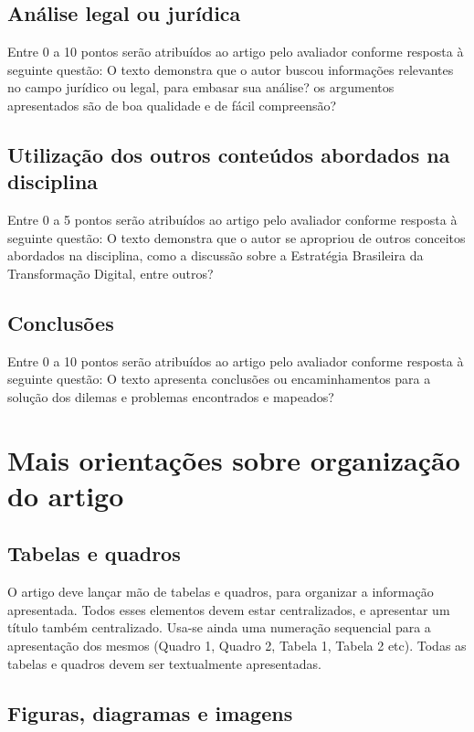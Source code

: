 \documentclass[12pt]{article}
\begin{document}
	\subsection{Análise legal ou jurídica}
	Entre 0 a 10 pontos serão atribuídos ao artigo pelo avaliador conforme resposta à seguinte questão: O texto demonstra que o autor buscou informações relevantes no campo jurídico ou legal, para embasar sua análise? os argumentos apresentados são de boa qualidade e de fácil compreensão?
	
	\subsection{Utilização dos outros conteúdos abordados na disciplina}
	Entre 0 a 5 pontos serão atribuídos ao artigo pelo avaliador conforme resposta à seguinte questão: O texto demonstra que o autor se apropriou de outros conceitos abordados na disciplina, como a discussão sobre a Estratégia Brasileira da Transformação Digital, entre outros?
	
	\subsection{Conclusões}
	Entre 0 a 10 pontos serão atribuídos ao artigo pelo avaliador conforme resposta à seguinte questão: O texto apresenta conclusões ou encaminhamentos para a solução dos dilemas e problemas encontrados e mapeados?
	
	\section{\label{mais:orientacoes}Mais orientações sobre organização do artigo}
	
	\subsection{Tabelas e quadros}
	
	O artigo deve lançar mão de tabelas e quadros, para organizar a informação apresentada. Todos esses elementos devem estar centralizados, e apresentar um título também centralizado. Usa-se ainda uma numeração sequencial para a apresentação dos mesmos (Quadro 1, Quadro 2, Tabela 1, Tabela 2 etc). Todas as tabelas e quadros devem ser textualmente apresentadas.
	
	\subsection{Figuras, diagramas e imagens}
	
\end{document}
